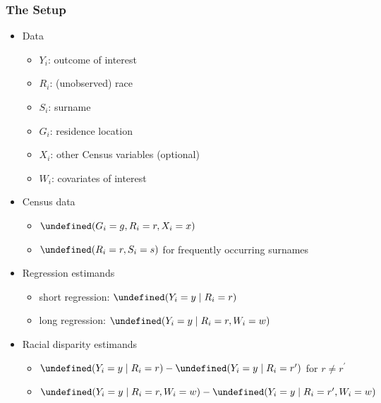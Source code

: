 \documentclass[handout]{beamer}
\let\Pr\undefined
\DeclareMathOperator{\Pr}{\mathbb{P}}
\begin{document}
\begin{frame}

\frametitle{The Setup}


\begin{itemize}
\item<1-> Data
  \begin{itemize}
  \item<1-> $Y_i$: outcome of interest 
  \item<1-> $R_i$: (unobserved) race
  \item<1-> $S_i$: surname
  \item<1-> $G_i$: residence location
  \item<1-> $X_i$: other Census variables (optional)
  \item<1-> $W_i$: covariates of interest
  \end{itemize}
\item<2-> Census data
  \begin{itemize}
  \item<2-> $\Pr(G_i = g, R_i = r, X_i = x)$
  \item<2-> $\Pr(R_i = r, S_i =s)$ for frequently occurring surnames
  \end{itemize}

  \vfill
\item<3-> Regression estimands
  \begin{itemize}
  \item<3-> short regression: $\Pr(Y_i = y \mid R_i = r)$
  \item<3-> long regression: $\Pr(Y_i = y \mid R_i = r, W_i =w)$
  \end{itemize}

\item<4-> Racial disparity estimands
  \begin{itemize}
  \item<4-> $\Pr(Y_i =y \mid R_i = r) - \Pr(Y_i = y \mid R_i = r^\prime)$ for $r
    \ne r^\prime$
  \item<4-> $\Pr(Y_i = y \mid R_i = r, W_i = w) - \Pr(Y_i = y \mid R_i = r^\prime, W_i = w)$
  \end{itemize}
\vspace{-.25in}
\end{itemize}

\end{frame}
\end{document}
